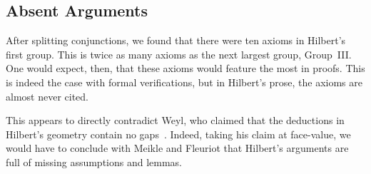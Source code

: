 
\subsection{Absent Arguments}
After splitting conjunctions, we found that there were ten axioms in Hilbert's first group. This is twice as many axioms as the next largest group, Group~III. One would expect, then, that these axioms would feature the most in proofs. This is indeed the case with formal verifications, but in Hilbert's prose, the axioms are almost never cited.

This appears to directly contradict Weyl, who claimed that the deductions in Hilbert's geometry contain no gaps~\cite{TableChairMug}. Indeed, taking his claim at face-value, we would have to conclude with Meikle and Fleuriot that Hilbert's arguments are full of missing assumptions and lemmas. 

